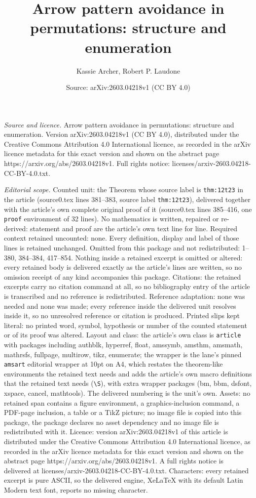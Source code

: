 \documentclass[10pt,a4paper]{amsart}
\title[Arrow pattern avoidance in permutations: structure and enume]{Arrow pattern avoidance in permutations: structure and enumeration}
\author{Kassie Archer, Robert P. Laudone}
\date{Source: arXiv:2603.04218v1 (CC BY 4.0)}
\begin{document}
\maketitle

\noindent\emph{Source and licence.} Arrow pattern avoidance in permutations: structure and enumeration. Version arXiv:2603.04218v1 (CC BY 4.0), distributed under the Creative Commons Attribution 4.0 International licence, as recorded in the arXiv licence metadata for this exact version and shown on the abstract page https://arxiv.org/abs/2603.04218v1. Full rights notice: licenses/arxiv-2603.04218-CC-BY-4.0.txt.\par\smallskip

\noindent\textit{Editorial scope.} Counted unit: the Theorem whose source label is \texttt{thm:12t23} in the article (source0.tex lines 381--383, source label \texttt{thm:12t23}), delivered together with the article's own complete original proof of it (source0.tex lines 385--416, one \texttt{proof} environment of 32 lines). No mathematics is written, repaired or re-derived: statement and proof are the article's own text line for line. Required context retained uncounted: none. Every definition, display and label of those lines is retained unchanged. Omitted from this package and not redistributed: 1--380, 384--384, 417--854. Nothing inside a retained excerpt is omitted or altered: every retained body is delivered exactly as the article's lines are written, so no omission receipt of any kind accompanies this package. Citations: the retained excerpts carry no citation command at all, so no bibliography entry of the article is transcribed and no reference is redistributed. Reference adaptation: none was needed and none was made; every reference inside the delivered unit resolves inside it, so no unresolved reference or citation is produced. Printed slips kept literal: no printed word, symbol, hypothesis or number of the counted statement or of its proof was altered. Layout and class: the article's own class is \texttt{article} with packages including authblk, hyperref, float, amssymb, amsthm, amsmath, mathrsfs, fullpage, multirow, tikz, enumerate; the wrapper is the lane's pinned \texttt{amsart} editorial wrapper at 10pt on A4, which restates the theorem-like environments the retained text needs and adds the article's own macro definitions that the retained text needs (\texttt{\textbackslash S}), with extra wrapper packages (bm, bbm, dsfont, xspace, cancel, mathtools). The delivered numbering is the unit's own. Assets: no retained span contains a figure environment, a graphics-inclusion command, a PDF-page inclusion, a table or a TikZ picture; no image file is copied into this package, the package declares no asset dependency and no image file is redistributed with it. Licence: version arXiv:2603.04218v1 of this article is distributed under the Creative Commons Attribution 4.0 International licence, as recorded in the arXiv licence metadata for this exact version and shown on the abstract page https://arxiv.org/abs/2603.04218v1. A full rights notice is delivered at licenses/arxiv-2603.04218-CC-BY-4.0.txt. Characters: every retained excerpt is pure ASCII, so the delivered engine, XeLaTeX with its default Latin Modern text font, reports no missing character.
\end{document}
